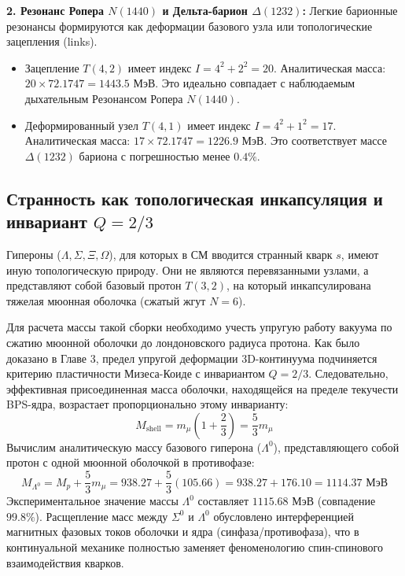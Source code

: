 \documentclass[12pt,a4paper]{article}
\begin{document}
	\textbf{2. Резонанс Ропера $N(1440)$ и Дельта-барион $\Delta(1232)$:}
	Легкие барионные резонансы формируются как деформации базового узла или топологические зацепления (links).
	\begin{itemize}
		\item Зацепление $T(4,2)$ имеет индекс $I = 4^2 + 2^2 = 20$. Аналитическая масса: $20 \times 72.1747 = \mathbf{1443.5 \text{ МэВ}}$. Это идеально совпадает с наблюдаемым дыхательным Резонансом Ропера $N(1440)$.
		\item Деформированный узел $T(4,1)$ имеет индекс $I = 4^2 + 1^2 = 17$. Аналитическая масса: $17 \times 72.1747 = \mathbf{1226.9 \text{ МэВ}}$. Это соответствует массе $\Delta(1232)$ бариона с погрешностью менее $0.4\%$.
	\end{itemize}
	
	\subsection{Странность как топологическая инкапсуляция и инвариант $Q=2/3$}
	Гипероны ($\Lambda, \Sigma, \Xi, \Omega$), для которых в СМ вводится странный кварк $s$, имеют иную топологическую природу. Они не являются перевязанными узлами, а представляют собой базовый протон $T(3,2)$, на который инкапсулирована тяжелая мюонная оболочка (сжатый жгут $N=6$).
	
	Для расчета массы такой сборки необходимо учесть упругую работу вакуума по сжатию мюонной оболочки до лондоновского радиуса протона. Как было доказано в Главе 3, предел упругой деформации 3D-континуума подчиняется критерию пластичности Мизеса-Коиде с инвариантом $Q = 2/3$.
	Следовательно, эффективная присоединенная масса оболочки, находящейся на пределе текучести BPS-ядра, возрастает пропорционально этому инварианту:
	\begin{equation}
		M_{\text{shell}} = m_\mu \left( 1 + \frac{2}{3} \right) = \frac{5}{3} m_\mu
	\end{equation}
	Вычислим аналитическую массу базового гиперона ($\Lambda^0$), представляющего собой протон с одной мюонной оболочкой в противофазе:
	\begin{equation}
		M_{\Lambda^0} = M_p + \frac{5}{3} m_\mu = 938.27 + \frac{5}{3}(105.66) = 938.27 + 176.10 = \mathbf{1114.37 \text{ МэВ}}
	\end{equation}
	Экспериментальное значение массы $\Lambda^0$ составляет $1115.68$ МэВ (совпадение $99.8\%$).
	Расщепление масс между $\Sigma^0$ и $\Lambda^0$ обусловлено интерференцией магнитных фазовых токов оболочки и ядра (синфаза/противофаза), что в континуальной механике полностью заменяет феноменологию спин-спинового взаимодействия кварков.
	
\end{document}
